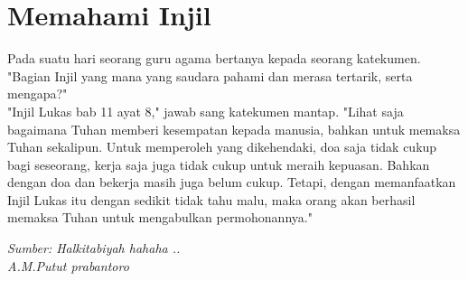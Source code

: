 \section*{Memahami Injil}
Pada suatu hari seorang guru agama bertanya kepada seorang katekumen. \\
"Bagian Injil yang mana yang saudara pahami dan merasa tertarik, serta mengapa?"\\
"Injil Lukas bab 11 ayat 8," jawab sang katekumen mantap. "Lihat saja bagaimana Tuhan memberi kesempatan kepada manusia, bahkan untuk memaksa Tuhan sekalipun. Untuk memperoleh yang dikehendaki, doa saja tidak cukup bagi seseorang, kerja saja juga tidak cukup untuk meraih kepuasan. Bahkan dengan doa dan bekerja masih juga belum cukup. Tetapi, dengan memanfaatkan Injil Lukas itu dengan sedikit tidak tahu malu, maka orang akan berhasil memaksa Tuhan untuk mengabulkan permohonannya."

{\noindent
\emph{Sumber: Halkitabiyah hahaha ..\\
A.M.Putut prabantoro}}

